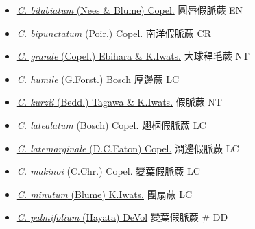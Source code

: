 \begin{itemize}
  \begin{itemize}
        \item[] \href{http://www.theplantlist.org/tpl1.1/search?q=Crepidomanes+bilabiatum}{\textit{C. bilabiatum} (Nees \& Blume) Copel.}   圓唇假脈蕨   EN
        \item[] \href{http://www.theplantlist.org/tpl1.1/search?q=Crepidomanes+bipunctatum}{\textit{C. bipunctatum} (Poir.) Copel.}   南洋假脈蕨   CR
        \item[] \href{http://www.theplantlist.org/tpl1.1/search?q=Crepidomanes+grande}{\textit{C. grande} (Copel.) Ebihara \& K.Iwats.}   大球稈毛蕨   NT
        \item[] \href{http://www.theplantlist.org/tpl1.1/search?q=Crepidomanes+humile}{\textit{C. humile} (G.Forst.) Bosch}   厚邊蕨   LC
        \item[] \href{http://www.theplantlist.org/tpl1.1/search?q=Crepidomanes+kurzii}{\textit{C. kurzii} (Bedd.) Tagawa \& K.Iwats.}   假脈蕨   NT
        \item[] \href{http://www.theplantlist.org/tpl1.1/search?q=Crepidomanes+latealatum}{\textit{C. latealatum} (Bosch) Copel.}   翅柄假脈蕨   LC
        \item[] \href{http://www.theplantlist.org/tpl1.1/search?q=Crepidomanes+latemarginale}{\textit{C. latemarginale} (D.C.Eaton) Copel.}   澗邊假脈蕨   LC
        \item[] \href{http://www.theplantlist.org/tpl1.1/search?q=Crepidomanes+makinoi}{\textit{C. makinoi} (C.Chr.) Copel.}   變葉假脈蕨   LC
        \item[] \href{http://www.theplantlist.org/tpl1.1/search?q=Crepidomanes+minutum}{\textit{C. minutum} (Blume) K.Iwats.}   團扇蕨   LC
        \item[] \href{http://www.theplantlist.org/tpl1.1/search?q=Crepidomanes+palmifolium}{\textit{C. palmifolium} (Hayata) DeVol}   變葉假脈蕨  \# DD

\end{itemize}
\end{itemize}

